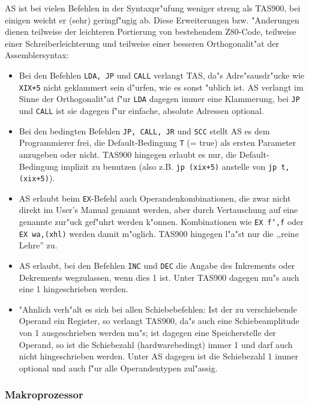 \documentclass[12pt,a4paper,twoside]{report}
\newcommand{\tty}[1]{{\tt #1}}
\newcommand{\asname}{AS}
\begin{document}
\asname{} ist bei vielen Befehlen in der Syntaxpr"ufung weniger streng als TAS900,
bei einigen weicht er (sehr) geringf"ugig ab.  Diese Erweiterungen bzw.
"Anderungen dienen teilweise der leichteren Portierung von bestehendem
Z80-Code, teilweise einer Schreiberleichterung und teilweise einer besseren
Orthogonalit"at der Assemblersyntax:
\begin{itemize}
\item{Bei den Befehlen \tty{LDA, JP} und \tty{CALL} verlangt TAS, da"s
      Adre"sausdr"ucke wie \tty{XIX+5} nicht geklammert sein d"urfen, wie
      es sonst "ublich ist.  \asname{} verlangt im Sinne der Orthogonalit"at f"ur
      \tty{LDA} dagegen immer eine Klammerung, bei \tty{JP} und \tty{CALL}
      ist sie dagegen f"ur einfache, absolute Adressen optional.}
\item{Bei den bedingten Befehlen \tty{JP, CALL, JR} und \tty{SCC} stellt
      \asname{} es dem Programmierer frei, die Default-Bedingung \tty{T} (= true) als
      ersten Parameter anzugeben oder nicht.  TAS900 hingegen erlaubt es
      nur, die Default-Bedingung implizit zu benutzen (also z.B.
      \tty{jp (xix+5)} anstelle von \tty{jp t,(xix+5)}).}
\item{\asname{} erlaubt beim \tty{EX}-Befehl auch Operandenkombinationen, die
      zwar nicht direkt im User's Manual\cite{Tosh900} genannt werden,
      aber durch Vertauschung auf eine genannte zur"uck gef"uhrt werden
      k"onnen.  Kombinationen wie \tty{EX f`,f} oder \tty{EX wa,(xhl)}
      werden damit m"oglich.  TAS900 hingegen l"a"st nur die ,,reine Lehre''
      zu.}
\item{\asname{} erlaubt, bei den Befehlen \tty{INC} und \tty{DEC} die Angabe
      des Inkrements oder Dekrements wegzulassen, wenn dies 1 ist.  Unter
      TAS900 dagegen mu"s auch eine 1 hingeschrieben werden.}
\item{"Ahnlich verh"alt es sich bei allen Schiebebefehlen: Ist der zu
      verschiebende Operand ein Register, so verlangt TAS900, da"s auch
      eine Schiebeamplitude von 1 ausgeschrieben werden mu"s; ist dagegen
      eine Speicherstelle der Operand, so ist die Schiebezahl
      (hardwarebedingt) immer 1 und darf auch nicht hingeschrieben werden.
      Unter \asname{} dagegen ist die Schiebezahl 1 immer optional und auch f"ur
      alle Operandentypen zul"assig.}
\end{itemize}

\subsubsection{Makroprozessor}
\end{document}

